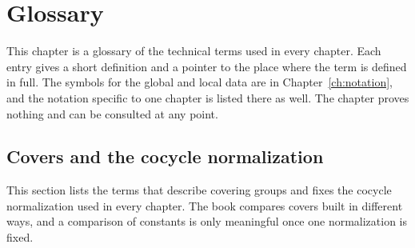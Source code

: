 \chapter{Glossary}\label{ch:glossary}
This chapter is a glossary of the technical terms used in every chapter. Each entry gives a short definition and a pointer to the place where the term is defined in full. The symbols for the global and local data are in Chapter~\ref{ch:notation}, and the notation specific to one chapter is listed there as well. The chapter proves nothing and can be consulted at any point.

\section{Covers and the cocycle normalization}\label{gl:cocycle}
This section lists the terms that describe covering groups and fixes the cocycle normalization used in every chapter. The book compares covers built in different ways, and a comparison of constants is only meaningful once one normalization is fixed.

